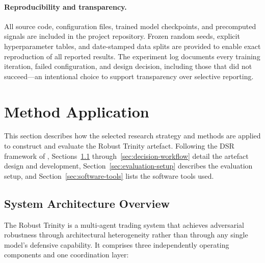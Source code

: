\paragraph{Reproducibility and transparency.}
All source code, configuration files, trained model checkpoints, and
precomputed signals are included in the project repository. Frozen random
seeds, explicit hyperparameter tables, and date-stamped data splits are
provided to enable exact reproduction of all reported results. The experiment
log documents every training iteration, failed configuration, and design
decision, including those that did not succeed---an intentional choice to
support transparency over selective reporting.

\section{Method Application}
\label{sec:method-application}

This section describes how the selected research strategy and methods are applied
to construct and evaluate the Robust Trinity artefact. Following the DSR framework
of \cite{johannesson2014design}, Sections~\ref{sec:architecture-overview}
through~\ref{sec:decision-workflow} detail the artefact design and development,
Section~\ref{sec:evaluation-setup} describes the evaluation setup, and
Section~\ref{sec:software-tools} lists the software tools used.


\subsection{System Architecture Overview}
\label{sec:architecture-overview}

The Robust Trinity is a multi-agent trading system that achieves adversarial
robustness through architectural heterogeneity rather than through any single
model's defensive capability. It comprises three independently operating
components and one coordination layer:


